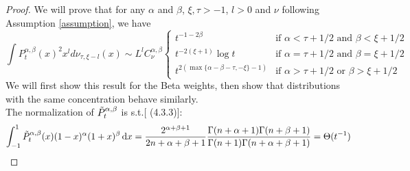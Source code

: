 \documentclass{article}
\begin{document}
\begin{proof}
We will prove that for any $\alpha$ and $\beta$, $\xi,\tau>-1$, $l>0$ and $\nu$ following Assumption \ref{assumption}, we have
\begin{equation*}
    \int P_t^{\alpha,\beta}(x)^2x^l d\nu_{\tau,\xi-l}(x) \sim  L^lC^{\alpha,\beta}_\nu\left\{
	\begin{array}{ll}
		  t^{-1-2\beta}& \mbox{if } 
		  \alpha<\tau+1/2 \text{ and } \beta <\xi+1/2\\
		  t^{-2(\xi+1)}\log t& \mbox{if } 
		  \alpha=\tau+1/2 \text{ and } \beta =\xi+1/2\\
		  t^{2(\max\{\alpha-\beta-\tau,-\xi\}-1)}& \mbox{if } 
		  \alpha>\tau+1/2 \text{ or } \beta >\xi+1/2
	\end{array}
\right.
\end{equation*}
We will first show this result for the Beta weights, then show that distributions with the same concentration behave similarly. \\
The normalization of $\Tilde{P}^{\alpha,\beta}_t$ is s.t.[ \cite{szego1975orthogonal} (4.3.3)]:
\begin{equation}
    \int_{-1}^1\Tilde{P}_t^{\alpha,\beta}(x)(1-x)^\alpha(1+x)^\beta \mathop{}\!\mathrm{d} x=\frac{2^{\alpha+\beta+1}}{2n+\alpha+\beta+1}\frac{\Gamma(n+\alpha+1)\Gamma(n+\beta+1)}{\Gamma(n+1)\Gamma(n+\alpha+\beta+1)}=\Theta(t^{-1})
\end{equation}


\end{proof}
\end{document}
